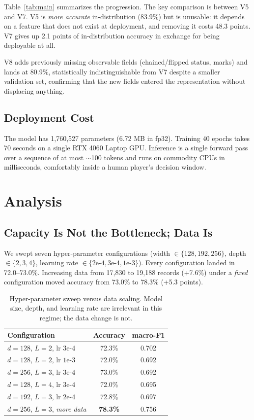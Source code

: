 \documentclass[11pt]{article}
\begin{document}
Table~\ref{tab:main} summarizes the progression. The key comparison is between V5 and V7. V5 is \emph{more accurate} in-distribution (83.9\%) but is unusable: it depends on a feature that does not exist at deployment, and removing it costs 48.3 points. V7 gives up 2.1 points of in-distribution accuracy in exchange for being deployable at all.

V8 adds previously missing observable fields (chained/flipped status, marks) and lands at 80.9\%, statistically indistinguishable from V7 despite a smaller validation set, confirming that the new fields entered the representation without displacing anything.

\subsection{Deployment Cost}

The model has 1,760,527 parameters (6.72 MB in fp32). Training 40 epochs takes 70 seconds on a single RTX 4060 Laptop GPU. Inference is a single forward pass over a sequence of at most $\sim$100 tokens and runs on commodity CPUs in milliseconds, comfortably inside a human player's decision window.

\section{Analysis}
\label{sec:analysis}

\subsection{Capacity Is Not the Bottleneck; Data Is}

We swept seven hyper-parameter configurations (width $\in \{128,192,256\}$, depth $\in \{2,3,4\}$, learning rate $\in \{2\text{e-}4, 3\text{e-}4, 1\text{e-}3\}$). Every configuration landed in 72.0--73.0\%. Increasing data from 17,830 to 19,188 records (+7.6\%) under a \emph{fixed} configuration moved accuracy from 73.0\% to 78.3\% (+5.3 points).

\begin{table}[t]
\centering
\small
\begin{tabular}{@{}lcc@{}}
\toprule
\textbf{Configuration} & \textbf{Accuracy} & \textbf{macro-F1} \\
\midrule
$d{=}128$, $L{=}2$, lr $3\text{e-}4$ & 72.3\% & 0.702 \\
$d{=}128$, $L{=}2$, lr $1\text{e-}3$ & 72.0\% & 0.692 \\
$d{=}256$, $L{=}3$, lr $3\text{e-}4$ & 73.0\% & 0.692 \\
$d{=}128$, $L{=}4$, lr $3\text{e-}4$ & 72.0\% & 0.695 \\
$d{=}192$, $L{=}3$, lr $2\text{e-}4$ & 72.8\% & 0.697 \\
\midrule
$d{=}256$, $L{=}3$, \emph{more data} & \textbf{78.3\%} & 0.756 \\
\bottomrule
\end{tabular}
\caption{Hyper-parameter sweep versus data scaling. Model size, depth, and learning rate are irrelevant in this regime; the data change is not.}
\label{tab:hyper}
\end{table}
\end{document}
